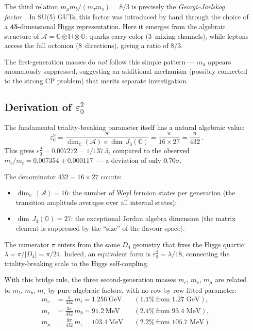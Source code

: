 \documentclass[12pt,a4paper]{article}
\theoremstyle{definition}
\theoremstyle{remark}
\newcommand{\Oct}{\mathbb{O}}
\newcommand{\Quat}{\mathbb{H}}
\newcommand{\Comp}{\mathbb{C}}
\newcommand{\Alg}{\mathcal{A}}
\begin{document}
\noindent
The third relation $m_\mu m_b/(m_\tau m_s) = 8/3$ is precisely the 
\emph{Georgi--Jarlskog factor}~\cite{GeorgiJarlskog1979}. In SU(5) GUTs, this 
factor was introduced by hand through the choice of a \textbf{45}-dimensional 
Higgs representation. Here it emerges from the algebraic structure of 
$\Alg = \Comp\otimes\Quat\otimes\Oct$: quarks carry color ($3$~mixing 
channels), while leptons access the full octonion ($8$~directions), giving 
a ratio of $8/3$.

The first-generation masses do \emph{not} follow this simple pattern --- 
$m_u$ appears anomalously suppressed, suggesting an additional mechanism 
(possibly connected to the strong CP problem) that merits separate investigation.

\subsection{Derivation of $\varepsilon_0^2$}

The fundamental triality-breaking parameter itself has a natural algebraic value:
\begin{equation}
\varepsilon_0^2 = \frac{\pi}{\dim_\Comp(\Alg) \times \dim\,J_3(\Oct)}
= \frac{\pi}{16 \times 27} = \frac{\pi}{432}\,.
\label{eq:eps0}
\end{equation}
This gives $\varepsilon_0^2 = 0.007272 = 1/137.5$, compared to the observed 
$m_c/m_t = 0.007354 \pm 0.000117$~--- a deviation of only $0.70\sigma$.

The denominator $432 = 16 \times 27$ counts:
\begin{itemize}
\item $\dim_\Comp(\Alg) = 16$: the number of Weyl fermion states per 
      generation (the transition amplitude averages over all internal states);
\item $\dim\,J_3(\Oct) = 27$: the exceptional Jordan algebra dimension 
      (the matrix element is suppressed by the ``size'' of the flavour space).
\end{itemize}
The numerator $\pi$ enters from the same $D_4$ geometry that fixes the 
Higgs quartic: $\lambda = \pi/|D_4| = \pi/24$. Indeed, an equivalent form is 
$\varepsilon_0^2 = \lambda/18$, connecting the triality-breaking scale to 
the Higgs self-coupling.

With this bridge rule, the three second-generation masses $m_c$, $m_s$, $m_\mu$ 
are related to $m_t$, $m_b$, $m_\tau$ by pure algebraic factors, with no 
row-by-row fitted parameter:
\begin{align}
m_c &= \frac{\pi}{432}\,m_t = 1.256~\text{GeV} & &(1.1\%~\text{from 1.27~GeV}), \\
m_s &= \frac{3\pi}{432}\,m_b = 91.2~\text{MeV} & &(2.4\%~\text{from 93.4~MeV}), \\
m_\mu &= \frac{8\pi}{432}\,m_\tau = 103.4~\text{MeV} & &(2.2\%~\text{from 105.7~MeV}).
\end{align}
\end{document}
